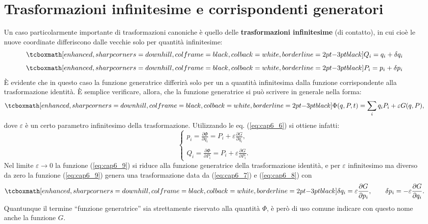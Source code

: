 \documentclass[a4paper,12pt,oneside]{book}
\begin{document}
\section[Trasformazioni infinitesime e corrispondenti generatori]{Trasformazioni infinitesime e corrispondenti generatori}
Un caso particolarmente importante di trasformazioni canoniche è quello delle \textbf{trasformazioni infinitesime} (di contatto), in cui cioè le nuove coordinate differiscono dalle vecchie solo per quantità infinitesime:
	\begin{equation}
		\tcboxmath[enhanced, sharp corners=downhill, colframe=black, colback=white, borderline={2pt}{-3pt}{black}]{
			Q_i = q_i + \delta q _i
			}
		\label{eq:cap6_7}
	\end{equation}
	\begin{equation}
		\tcboxmath[enhanced, sharp corners=downhill, colframe=black, colback=white, borderline={2pt}{-3pt}{black}]{
			P_i = p_i + \delta p _i
			}
		\label{eq:cap6_8} 
	\end{equation}
È evidente che in questo caso la funzione generatrice differirà solo per un a quantità infinitesima dalla funzione corrispondente alla trasformazione identità. È semplice verificare, allora, che la funzione generatrice si può scrivere in generale nella forma:
	\begin{equation}
		\tcboxmath[enhanced, sharp corners=downhill, colframe=black, colback=white, borderline={2pt}{-3pt}{black}]{
			\Phi(q, P, t) = \sum _i q_iP_i +\varepsilon G(q, P) ,
			}
		\label{eq:cap6_9}
	\end{equation}
dove $\varepsilon $ è un certo parametro infinitesimo della trasformazione. Utilizzando le eq. (\ref{eq:cap6_6}) si ottiene infatti:
	\begin{equation}
		\begin{cases}
		\displaystyle{p_i= \frac{\partial \Phi}{\partial q_i} = P_i + \varepsilon \frac{\partial G}{\partial q_i }, }\\
		\\
		\displaystyle{Q_i= \frac{\partial \Phi}{\partial P_i} = P_i + \varepsilon \frac{\partial G}{\partial P_i }.}
		\end{cases}
	\end{equation}
Nel limite $\varepsilon \rightarrow 0$ la funzione (\ref{eq:cap6_9}) si riduce alla funzione generatrice della trasformazione identità, e per $\varepsilon$ infinitesimo ma diverso da zero la funzione (\ref{eq:cap6_9}) genera una trasformazione data da (\ref{eq:cap6_7}) e (\ref{eq:cap6_8}) con
	\begin{equation}
		\tcboxmath[enhanced, sharp corners=downhill, colframe=black, colback=white, borderline={2pt}{-3pt}{black}]{
			\delta q_i = \varepsilon \frac{\partial G}{\partial p_i },\qquad \delta p _i = -\varepsilon \frac{\partial G}{\partial q_i } .
			}
		\label{eq:cap6_11}
	\end{equation}	
Quantunque il termine  ``funzione generatrice''  sia strettamente riservato alla quantità $\Phi$, è però di uso comune indicare con questo nome anche la funzione $G$.\\
\end{document}
